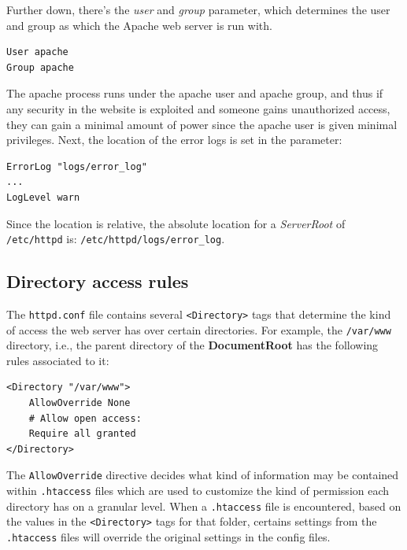 Further down, there's the \textit{user} and \textit{group} parameter, which determines the user and group as which the Apache web server is run with. 

\vspace{-15pt}
\begin{verbatim}
User apache
Group apache
\end{verbatim}
\vspace{-10pt}	

\noindent
The apache process runs under the apache user and apache group, and thus if any security in the website is exploited and someone gains unauthorized access, they can gain a minimal amount of power since the apache user is given minimal privileges. Next, the location of the error logs is set in the parameter:

\vspace{-15pt}
\begin{verbatim}
ErrorLog "logs/error_log"
...
LogLevel warn
\end{verbatim}
\vspace{-10pt}	

\noindent
Since the location is relative, the absolute location for a \textit{ServerRoot} of \verb|/etc/httpd| is: \verb|/etc/httpd/logs/error_log|. 

\subsection{Directory access rules}
The \verb|httpd.conf| file contains several \verb|<Directory>| tags that determine the kind of access the web server has over certain directories. For example, the \verb|/var/www| directory, i.e., the parent directory of the \textbf{DocumentRoot} has the following rules associated to it:

\vspace{-15pt}
\begin{verbatim}
<Directory "/var/www">
	AllowOverride None
	# Allow open access:
	Require all granted
</Directory>
\end{verbatim}
\vspace{-10pt}	

\noindent
The \verb|AllowOverride| directive decides what kind of information may be contained within \verb|.htaccess| files which are used to customize the kind of permission each directory has on a granular level. When a \verb|.htaccess| file is encountered, based on the values in the \verb|<Directory>| tags for that folder, certains settings from the \verb|.htaccess| files will override the original settings in the config files. 

